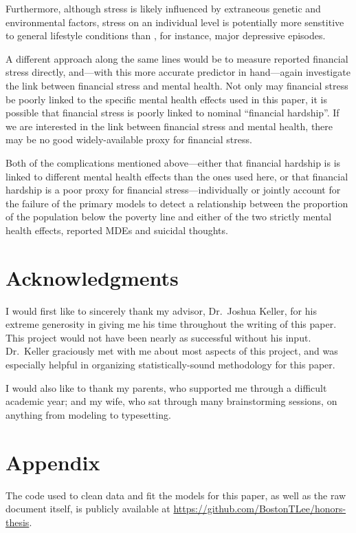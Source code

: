 \documentclass{article}
\begin{document}
Furthermore, although stress is likely influenced by
extraneous genetic and environmental factors,
stress on an individual level is potentially more
senstitive to general lifestyle conditions than
, for instance,
major depressive episodes.

A different approach along the same lines would be
to measure reported financial stress directly,
and---with this more accurate predictor in hand---again
investigate the link between financial stress
and mental health.
Not only may financial stress be poorly linked to
the specific mental health effects used in this paper,
it is possible that financial stress is poorly linked
to nominal ``financial hardship''.
If we are interested in the link between financial stress and mental health,
there may be no good widely-available proxy for financial stress.

Both of the complications mentioned above---either
that financial hardship is is linked to different mental
health effects than the ones used here,
or that financial hardship is a poor proxy for financial
stress---individually or jointly account for the
failure of the primary models to detect a relationship
between the proportion of the population below the poverty line
and either of the two strictly mental health effects,
reported MDEs and suicidal thoughts.

\section{Acknowledgments}

I would first like to sincerely thank my advisor,
Dr.\ Joshua Keller, for his extreme generosity in giving
me his time throughout the writing of this paper.
This project would not have been nearly as successful
without his input.
Dr.\ Keller graciously met with me about most
aspects of this project, and was especially
helpful in organizing statistically-sound
methodology for this paper.

I would also like to thank my parents, who supported
me through a difficult academic year; and my wife,
who sat through many brainstorming sessions,
on anything from modeling to typesetting.

\pagebreak

\section{Appendix}

The code used to clean data and fit the models for this
paper, as well as the raw document itself,
is publicly available at
\url{https://github.com/BostonTLee/honors-thesis}.
\end{document}
